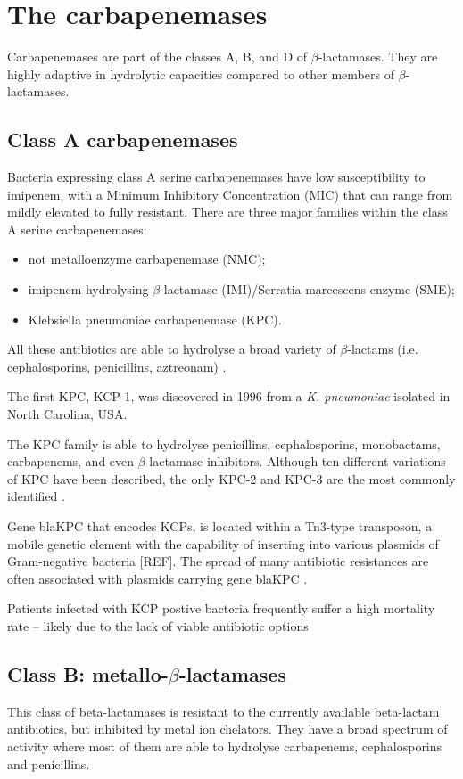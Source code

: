 \documentclass[11pt]{report}
\begin{document}
\section{The carbapenemases}
Carbapenemases are part of the classes A, B, and D of $\beta$-lactamases. They are highly adaptive in hydrolytic capacities compared to other members of $\beta$-lactamases.

\subsection{Class A carbapenemases}
Bacteria expressing class A serine carbapenemases have low susceptibility to imipenem, with a Minimum Inhibitory Concentration (MIC) that can range from mildly elevated to fully resistant. 
There are three major families within the class A serine carbapenemases:

\begin{itemize}
\item not metalloenzyme carbapenemase (NMC);
\item imipenem-hydrolysing $\beta$-lactamase (IMI)/Serratia marcescens enzyme (SME); 
\item Klebsiella pneumoniae carbapenemase (KPC).
\end{itemize}

All these antibiotics are able to hydrolyse a broad variety of $\beta$-lactams (i.e. cephalosporins, penicillins, aztreonam) \cite{kong2010beta} \cite{Queenan2007}.

The first KPC, KCP-1, was discovered in 1996 from a \emph{K. pneumoniae} isolated in North Carolina, USA.

The KPC family is able to hydrolyse penicillins, cephalosporins, monobactams, carbapenems, and even $\beta$-lactamase inhibitors. Although ten different variations of KPC have been described, the only KPC-2 and KPC-3 are the most commonly identified \cite{WaltherRasmussen2007} \cite{MunozPrice2013}.

Gene blaKPC that encodes KCPs, is located within a Tn3-type transposon, a mobile genetic element with the capability of inserting into various plasmids of Gram-negative bacteria [REF].  The spread of many antibiotic resistances are often associated with plasmids carrying gene blaKPC \cite{Queenan2007}.

Patients infected with KCP postive bacteria frequently suffer a high mortality rate – likely due to the lack of viable antibiotic options \cite{MunozPrice2013}

\subsection {Class B: metallo-$\beta$-lactamases}
This class of beta-lactamases is resistant to the currently available beta-lactam antibiotics, but inhibited by metal ion chelators.
They have a broad spectrum of activity where most of them are able to hydrolyse carbapenems, cephalosporins and penicillins.
\end{document}
